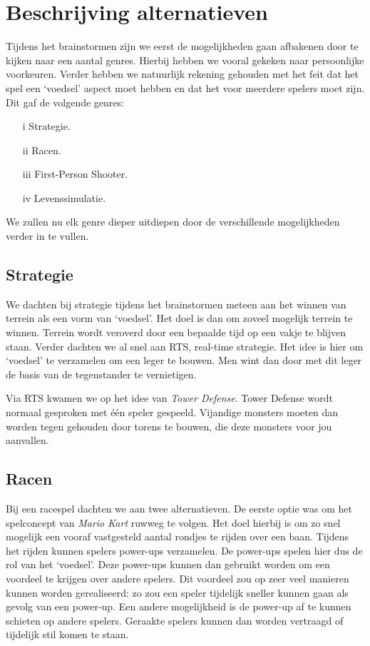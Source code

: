 \section{Beschrijving alternatieven}
Tijdens het brainstormen zijn we eerst de mogelijkheden gaan afbakenen door te kijken naar een aantal genres. Hierbij hebben we vooral gekeken naar persoonlijke voorkeuren. Verder hebben we natuurlijk rekening gehouden met het feit dat het spel een `voedsel' aspect moet hebben en dat het voor meerdere spelers moet zijn. Dit gaf de volgende genres:
\begin{enumerate}
\item[i] Strategie.
\item[ii] Racen.
\item[iii] First-Person Shooter.
\item[iv] Levenssimulatie.
\end{enumerate}
We zullen nu elk genre dieper uitdiepen door de verschillende mogelijkheden verder in te vullen.

\subsection{Strategie}
We dachten bij strategie tijdens het brainstormen meteen aan het winnen van terrein als een vorm van `voedsel'. Het doel is dan om zoveel mogelijk terrein te winnen. Terrein wordt veroverd door een bepaalde tijd op een vakje te blijven staan. Verder dachten we al snel aan RTS, real-time strategie. Het idee is hier om `voedsel' te verzamelen om een leger te bouwen. Men wint dan door met dit leger de basis van de tegenstander te vernietigen.

Via RTS kwamen we op het idee van \emph{Tower Defense}. Tower Defense wordt normaal gesproken met \'e\'en speler gespeeld. Vijandige monsters moeten dan worden tegen gehouden door torens te bouwen, die deze monsters voor jou aanvallen.

\subsection{Racen}
Bij een racespel dachten we aan twee alternatieven. De eerste optie was om het spelconcept van \emph{Mario Kart} ruwweg te volgen. Het doel hierbij is om zo snel mogelijk een vooraf vastgesteld aantal rondjes te rijden over een baan. Tijdens het rijden kunnen spelers power-ups verzamelen. De power-ups spelen hier dus de rol van het `voedsel'. Deze power-ups kunnen dan gebruikt worden om een voordeel te krijgen over andere spelers. Dit voordeel zou op zeer veel manieren kunnen worden gerealiseerd: zo zou een speler tijdelijk sneller kunnen gaan als gevolg van een power-up. Een andere mogelijkheid is de power-up af te kunnen schieten op andere spelers. Geraakte spelers kunnen dan worden vertraagd of tijdelijk stil komen te staan.

